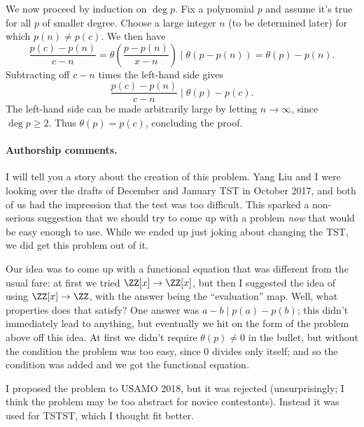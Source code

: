 \documentclass[11pt]{scrartcl}
\begin{document}
We now proceed by induction on $\deg p$.
Fix a polynomial $p$ and assume it's true
for all $p$ of smaller degree.
Choose a large integer $n$ (to be determined later)
for which $p(n) \neq p(c)$.
We then have
\[ \frac{p(c)-p(n)}{c-n}
  = \theta\left( \frac{p-p(n)}{x-n} \right)
  \mid \theta\left( p-p(n) \right)
  = \theta(p) - p(n). \]
Subtracting off $c-n$ times the left-hand side gives
\[ \frac{p(c)-p(n)}{c-n}
  \mid \theta(p) - p(c). \]
The left-hand side can be made arbitrarily large
by letting $n \to \infty$, since $\deg p \ge 2$.
Thus $\theta(p) = p(c)$, concluding the proof.

\paragraph{Authorship comments.}
I will tell you a story about the creation of this problem.
Yang Liu and I were looking over the drafts of December and
January TST in October 2017,
and both of us had the impression that the test was too difficult.
This sparked a non-serious suggestion that we should try to
come up with a problem \emph{now} that would be easy enough to use.
While we ended up just joking about changing the TST,
we did get this problem out of it.

Our idea was to come up with a functional equation that
was different from the usual fare:
at first we tried $\ZZ[x] \to \ZZ[x]$,
but then I suggested the idea of using $\ZZ[x] \to \ZZ$,
with the answer being the ``evaluation'' map.
Well, what properties does that satisfy?
One answer was $a-b \mid p(a)-p(b)$;
this didn't immediately lead to anything,
but eventually we hit on the form of the problem above off this idea.
At first we didn't require $\theta(p) \neq 0$ in the bullet,
but without the condition the problem was too easy,
since $0$ divides only itself;
and so the condition was added and we got the functional equation.

I proposed the problem to USAMO 2018, but it was rejected
(unsurprisingly; I think the problem may be
too abstract for novice contestants).
Instead it was used for TSTST, which I thought fit better.
\pagebreak
\end{document}
